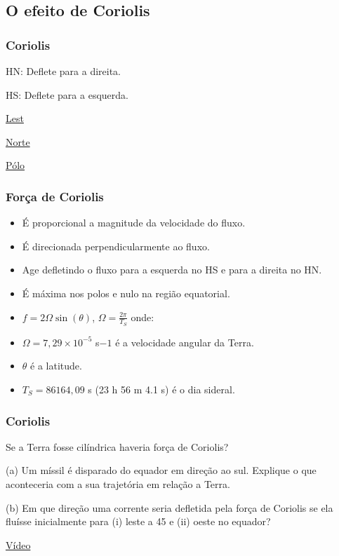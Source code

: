 \subsection{O efeito de Coriolis}
\begin{frame}
 \frametitle{Coriolis}
 \begin{block}{}
  HN: Deflete para a direita.

  HS: Deflete para a esquerda.
 \end{block}
  \href{http://www.physics.orst.edu/~mcintyre/coriolis/East_GIF.html}{Lest}

  \href{http://www.physics.orst.edu/~mcintyre/coriolis/North_Lon_GIF.html}{Norte}

  \href{http://www.physics.orst.edu/~mcintyre/coriolis/North_Pole_GIF.html}{Pólo}

\end{frame}

\begin{frame}
 \frametitle{Força de Coriolis}
 \small{
 \begin{itemize}[<+-| alert@+>]
  \item É proporcional a magnitude da velocidade do
        fluxo.
  \item É direcionada perpendicularmente ao fluxo.
  \item Age defletindo o fluxo para a esquerda no HS e para a direita
        no HN.
  \item É máxima nos polos e nulo na região equatorial.
  \item \( f = 2\Omega\sin(\theta) \), \( \Omega = \frac{2\pi}{T_S} \)
        onde:
  \item $\Omega = 7,29 \times 10^{-5}$ s${-1}$ é a velocidade angular da Terra.
  \item $\theta$ é a latitude.
  \item $T_S = 86164,09$ s (23 h 56 m 4.1 s) é o dia sideral.
 \end{itemize}
 }
\end{frame}


\begin{frame}
 \frametitle{Coriolis}
 \begin{block}{}
    Se a Terra fosse cilíndrica haveria força de Coriolis?
 \end{block}
  \pause
 \begin{block}{}
  (a) Um míssil é disparado do equador em direção ao sul.  Explique o
  que aconteceria com a sua trajetória em relação a Terra.

  (b) Em que direção uma corrente seria defletida pela força de
  Coriolis se ela fluísse inicialmente para (i) leste a
  45 e (ii) oeste no equador?
 \end{block}
  \href{http://www.youtube.com/watch?v=1PWjOMrPkrI}{Vídeo}
\end{frame}

